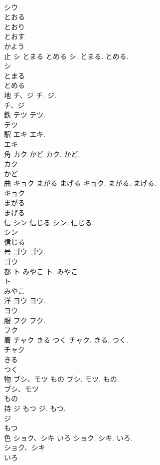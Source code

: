 \documentclass[8pt]{extreport}
\begin{document}
\begin{CJK}{UTF8}{min}
\\	シウ
\\	とおる
\\	とおり
\\	とおす
\\	かよう
\\	止	シ とまる とめる	シ. とまる. とめる.	
\\	シ
\\	とまる
\\	とめる
\\	地	チ、ジ	チ. ジ.	
\\	チ、ジ
\\	鉄	テツ	テツ.	
\\	テツ
\\	駅	エキ	エキ.	
\\	エキ
\\	角	カク かど	カク. かど.	
\\	カク
\\	かど
\\	曲	キョク まがる まげる	キョク. まがる. まげる.	
\\	キョク
\\	まがる
\\	まげる
\\	信	シン 信じる	シン. 信じる.	
\\	シン
\\	信じる
\\	号	ゴウ	ゴウ.	
\\	ゴウ
\\	都	ト みやこ	ト. みやこ.	
\\	ト
\\	みやこ
\\	洋	ヨウ	ヨウ.	
\\	ヨウ
\\	服	フク	フク.	
\\	フク
\\	着	チャク きる つく	チャク. きる. つく.	
\\	チャク
\\	きる
\\	つく
\\	物	ブシ、モツ もの	ブシ. モツ. もの.	
\\	ブシ、モツ
\\	もの
\\	持	ジ もつ	ジ. もつ.	
\\	ジ
\\	もつ
\\	色	ショク、シキ いろ	ショク. シキ. いろ.	
\\	ショク、シキ
\\	いろ

\end{CJK}
\end{document}
